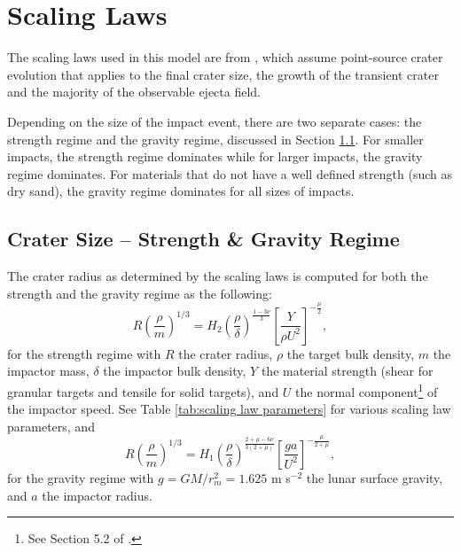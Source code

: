 \documentclass{article}
\begin{document}
\section{Scaling Laws}\label{sec:Scaling Laws}
The scaling laws used in this model are from \cite{housen2011ejecta}, which assume point-source crater evolution that applies to the final crater size, the growth of the transient crater and the majority of the observable ejecta field.

Depending on the size of the impact event, there are two separate cases: the strength regime and the gravity regime, discussed in Section \ref{ssec:Crater Size}. For smaller impacts, the strength regime dominates while for larger impacts, the gravity regime dominates. For materials that do not have a well defined strength (such as dry sand), the gravity regime dominates for all sizes of impacts.


\subsection{Crater Size -- Strength \& Gravity Regime}\label{ssec:Crater Size}

The crater radius as determined by the \cite{housen2011ejecta} scaling laws is computed for both the strength and the gravity regime as the following:
\begin{equation}\label{eq:R gravity}
R\left(\frac{\rho}{m}\right)^{1/3} = H_2\left(\frac{\rho}{\delta}\right)^{\frac{1-3\nu}{3}}\left[\frac{Y}{\rho U^2}\right]^{-\frac{\mu}{2}},
\end{equation}
for the strength regime with $R$ the crater radius, $\rho$ the target bulk density, $m$ the impactor mass, $\delta$ the impactor bulk density, $Y$ the material strength (shear for granular targets and tensile for solid targets), and $U$ the normal component\footnote{See Section 5.2 of \cite{housen2011ejecta}.} of the impactor speed. See Table \ref{tab:scaling law parameters} for various scaling law parameters, and
\begin{equation}\label{eq:R strength}
R\left(\frac{\rho}{m}\right)^{1/3} = H_1\left(\frac{\rho}{\delta}\right)^{\frac{2+\mu-6\nu}{3(2+\mu)}}\left[\frac{ga}{U^2}\right]^{-\frac{\mu}{2+\mu}},
\end{equation}
for the gravity regime with $g = GM/r_m^2 = 1.625$ m s$^{-2}$ the lunar surface gravity, and $a$ the impactor radius.  

%
\end{document}
